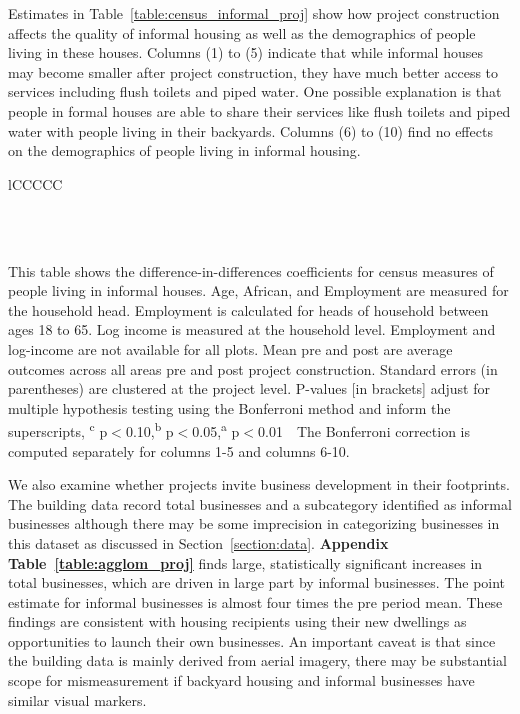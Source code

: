 \documentclass[12pt]{article}
\newcommand{\regtextfirst}{
Mean pre and post are average outcomes across all areas pre and post project construction.  Standard errors (in parentheses) are clustered at the project level.  P-values [in brackets] adjust for multiple hypothesis testing using the Bonferroni method and inform the superscripts, \textsuperscript{c} p$<$0.10,\textsuperscript{b} p$<$0.05,\textsuperscript{a} p$<$0.01 \,\,
}
\newcommand{\rv}{}
\newcommand{\rw}{\textbf}
\begin{document}
\rv{Estimates in Table~\ref{table:census_informal_proj} show how project construction affects the quality of informal housing as well as the demographics of people living in these houses.  Columns (1) to (5) indicate that while informal houses may become smaller after project construction, they have much better access to services including flush toilets and piped water.  One possible explanation is that people in formal houses are able to share their services like flush toilets and piped water with people living in their backyards.  Columns (6) to (10) find no effects on the demographics of people living in informal housing.}

\begin{table}[h!]
\small
\centering
\caption{Direct Effects on Informal House Quality and Demographics for Inhabitants}\label{table:census_informal_proj} 
\vspace{-2mm}
\begin{threeparttable}
\begin{tabular}{lCCCCC}
\toprule

\\
\\\midrule

\bottomrule
\end{tabular}
\begin{tablenotes}
\item \footnotesize This table shows the difference-in-differences coefficients for census measures of people living in informal houses. Age, African, and Employment are measured for the household head.  Employment is calculated for heads of household between ages 18 to 65.  Log income is measured at the household level.  Employment and log-income are not available for all plots.   \regtextfirst The Bonferroni correction is computed separately for columns 1-5 and columns 6-10.
\end{tablenotes}
\end{threeparttable}
\end{table}


We also examine whether projects invite business development in their footprints.  The building data record total businesses and a subcategory identified as informal businesses although there may be some imprecision in categorizing businesses in this dataset as discussed in Section~\ref{section:data}.  \rw{Appendix Table~\ref{table:agglom_proj}} finds large, statistically significant increases in total businesses, which are driven in large part by informal businesses.  The point estimate for informal businesses is almost four times the pre period mean.  These findings are consistent with housing recipients using their new dwellings as opportunities to launch their own businesses.  An important caveat is that since the building data is mainly derived from aerial imagery, there may be substantial scope for mismeasurement if backyard housing and informal businesses have similar visual markers.
\end{document}
